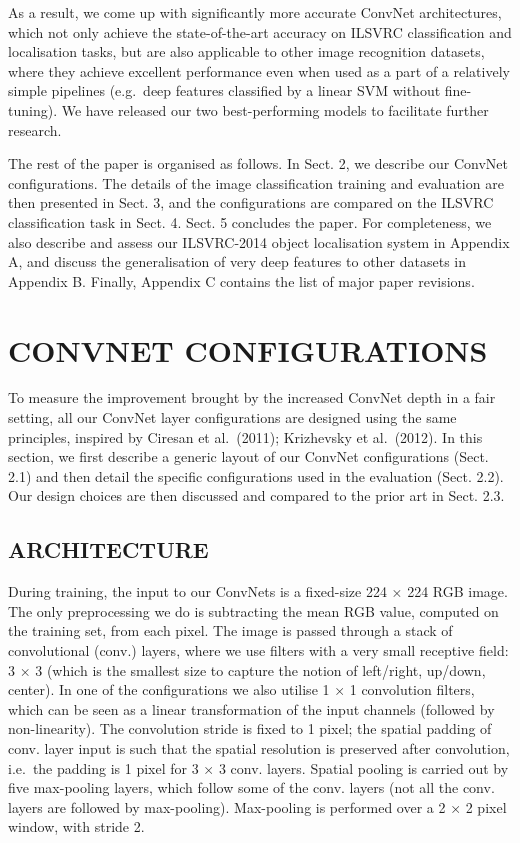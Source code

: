 \documentclass[12pt,a4paper,UTF8,twoside]{book}
\begin{document}
As a result, we come up with significantly more accurate ConvNet architectures, which not only achieve the state-of-the-art accuracy on ILSVRC classification and localisation tasks, but are also applicable to other image recognition datasets, where they achieve excellent performance even when used as a part of a relatively simple pipelines (e.g.~deep features classified by a linear SVM without fine-tuning). We have released our two best-performing models to facilitate further research.

The rest of the paper is organised as follows. In Sect. 2, we describe our ConvNet configurations. The details of the image classification training and evaluation are then presented in Sect. 3, and the configurations are compared on the ILSVRC classification task in Sect. 4. Sect. 5 concludes the paper. For completeness, we also describe and assess our ILSVRC-2014 object localisation system in Appendix A, and discuss the generalisation of very deep features to other datasets in Appendix B. Finally, Appendix C contains the list of major paper revisions.

\hypertarget{convnet-configurations}{%
\section{CONVNET CONFIGURATIONS}\label{convnet-configurations}}

To measure the improvement brought by the increased ConvNet depth in a fair setting, all our ConvNet layer configurations are designed using the same principles, inspired by Ciresan et al.~(2011); Krizhevsky et al.~(2012). In this section, we first describe a generic layout of our ConvNet configurations (Sect. 2.1) and then detail the specific configurations used in the evaluation (Sect. 2.2). Our design choices are then discussed and compared to the prior art in Sect. 2.3.

\hypertarget{architecture}{%
\subsection{ARCHITECTURE}\label{architecture}}

During training, the input to our ConvNets is a fixed-size 224 × 224 RGB image. The only preprocessing we do is subtracting the mean RGB value, computed on the training set, from each pixel. The image is passed through a stack of convolutional (conv.) layers, where we use filters with a very small receptive field: 3 × 3 (which is the smallest size to capture the notion of left/right, up/down, center). In one of the configurations we also utilise 1 × 1 convolution filters, which can be seen as a linear transformation of the input channels (followed by non-linearity). The convolution stride is fixed to 1 pixel; the spatial padding of conv. layer input is such that the spatial resolution is preserved after convolution, i.e.~the padding is 1 pixel for 3 × 3 conv. layers. Spatial pooling is carried out by five max-pooling layers, which follow some of the conv. layers (not all the conv. layers are followed by max-pooling). Max-pooling is performed over a 2 × 2 pixel window, with stride 2.
\end{document}
